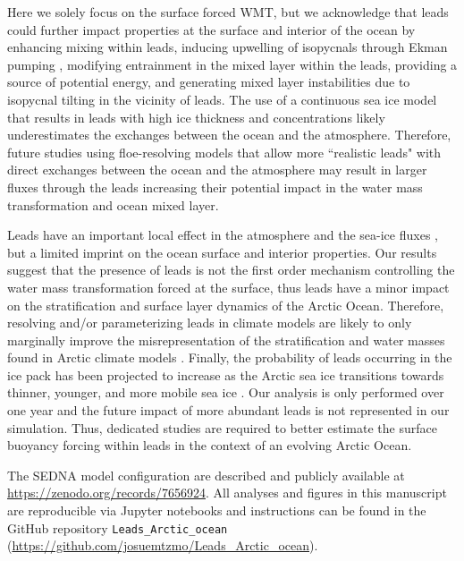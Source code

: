 \documentclass[lineno,sn-basic]{sn-jnl}%
\begin{document}
Here we solely focus on the surface forced WMT, but we acknowledge that leads could further impact properties at the surface and interior of the ocean by enhancing mixing within leads, inducing upwelling of isopycnals through Ekman pumping \citep{McPhee_LKF_2005}, modifying  entrainment in the mixed layer within the leads, providing a source of potential energy, and generating mixed layer instabilities due to isopycnal tilting in the vicinity of leads. The use of a continuous sea ice model that results in leads with high ice thickness and concentrations likely underestimates the exchanges between the ocean and the atmosphere. Therefore, future studies using floe-resolving models that allow more ``realistic leads" with direct exchanges between the ocean and the atmosphere may result in larger fluxes through the leads increasing their potential impact in the water mass transformation and ocean mixed layer.

Leads have an important local effect in the atmosphere and the sea-ice fluxes \citep{Marcq_flux_lead_2012, Lupkes_leads_2008, Wettlaufer_insulator_1997, Smith_polynyas_1990}, but a limited imprint on the ocean surface and interior properties. Our results suggest that the presence of leads is not the first order mechanism controlling the water mass transformation forced at the surface, thus leads have a minor impact on the stratification and surface layer dynamics of the Arctic Ocean.
Therefore, resolving and/or parameterizing leads in climate models are likely to only marginally improve the misrepresentation of the stratification and water masses found in Arctic climate models \citep{Wang_ompi_2024,Ilicak_core_2016}. Finally, the probability of leads occurring in the ice pack has been projected to increase as the Arctic sea ice transitions towards thinner, younger, and more mobile sea ice \citep{Boutin_rheology_2023, IPCC_arctic_2022}. Our analysis is only performed over one year and the future impact of more abundant leads is not represented in our simulation. Thus, dedicated studies are required to better estimate the surface buoyancy forcing within leads in the context of an evolving Arctic Ocean.



\backmatter


The SEDNA model configuration are described and publicly available at \url{https://zenodo.org/records/7656924}.
All analyses and figures in this manuscript are reproducible via Jupyter notebooks and instructions can be found in the GitHub repository \texttt{Leads\_Arctic\_ocean} (\url{https://github.com/josuemtzmo/Leads_Arctic_ocean}).
\end{document}
